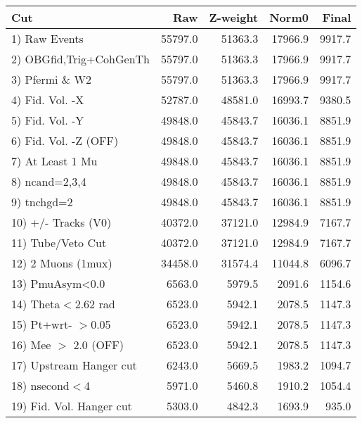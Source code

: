  \begin{table}[h!]\centering
 \begin{tabular}{||l||r|r|r|r||}
 \hline
 \hline
 Cut & Raw & Z-weight & Norm0 & Final \\
 \hline
  1) Raw Events           &     55797.0 &     51363.3 &     17966.9 &      9917.7 \\
  2) OBGfid,Trig+CohGenTh &     55797.0 &     51363.3 &     17966.9 &      9917.7 \\
  3) Pfermi \& W2         &     55797.0 &     51363.3 &     17966.9 &      9917.7 \\
  4) Fid. Vol. -X         &     52787.0 &     48581.0 &     16993.7 &      9380.5 \\
  5) Fid. Vol. -Y         &     49848.0 &     45843.7 &     16036.1 &      8851.9 \\
  6) Fid. Vol. -Z (OFF)   &     49848.0 &     45843.7 &     16036.1 &      8851.9 \\
  7) At Least 1 Mu        &     49848.0 &     45843.7 &     16036.1 &      8851.9 \\
  8) ncand=2,3,4          &     49848.0 &     45843.7 &     16036.1 &      8851.9 \\
  9) tnchgd=2             &     49848.0 &     45843.7 &     16036.1 &      8851.9 \\
 10) +/- Tracks (V0)      &     40372.0 &     37121.0 &     12984.9 &      7167.7 \\
 11) Tube/Veto Cut        &     40372.0 &     37121.0 &     12984.9 &      7167.7 \\
 12) 2 Muons (1mux)       &     34458.0 &     31574.4 &     11044.8 &      6096.7 \\
 13) PmuAsym<0.0          &      6563.0 &      5979.5 &      2091.6 &      1154.6 \\
 14) Theta$<$2.62 rad     &      6523.0 &      5942.1 &      2078.5 &      1147.3 \\
 15) Pt+wrt- $>$0.05      &      6523.0 &      5942.1 &      2078.5 &      1147.3 \\
 16) Mee $>$ 2.0  (OFF)   &      6523.0 &      5942.1 &      2078.5 &      1147.3 \\
 17) Upstream Hanger cut  &      6243.0 &      5669.5 &      1983.2 &      1094.7 \\
 18) nsecond$<$4          &      5971.0 &      5460.8 &      1910.2 &      1054.4 \\
 19) Fid. Vol. Hanger cut &      5303.0 &      4842.3 &      1693.9 &       935.0 \\

\end{tabular}
\end{table}
